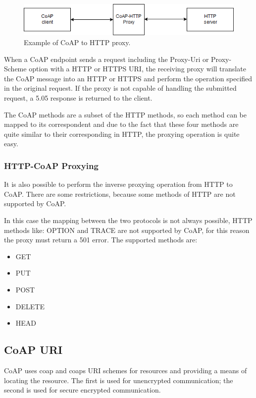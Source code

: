 	\begin{figure}
		\includegraphics[width=\linewidth]{coap-img1.png}
		\caption{Example of CoAP to HTTP proxy.}
		\label{fig:coap2}
	\end{figure}
	
	When a CoAP endpoint sends a request including the Proxy-Uri or Proxy-Scheme option with a HTTP or HTTPS URI, the receiving proxy will translate the CoAP message into an HTTP or HTTPS and perform the operation specified in the original request.\newline
	If the proxy is not capable of handling the submitted request, a 5.05 response is returned to the client.\newline

	The CoAP methods are a subset of the HTTP methods, so each method can be mapped to its correspondent
	and due to the fact that these four methods are quite similar to their corresponding in HTTP, the proxying operation is quite easy.\newline
	
	\subsubsection{HTTP-CoAP Proxying}
	It is also possible to perform the inverse proxying operation from HTTP to CoAP.\newline
	There are some restrictions, because some methods of HTTP are not supported by CoAP.
	
	In this case the mapping between the two protocols is not always possible, HTTP methods like:
	OPTION and TRACE are not supported by CoAP, for this reason the proxy must return a 501 error.\newline
	The supported methods are:
	\begin{itemize}
		\item GET
		\item PUT
		\item POST
		\item DELETE
		\item HEAD
	\end{itemize}
	
	\subsection{CoAP URI}
	CoAP uses coap and coaps URI schemes for resources and providing a means of locating the resource.
	The first is used for unencrypted communication; the second is used for secure encrypted communication.
	
